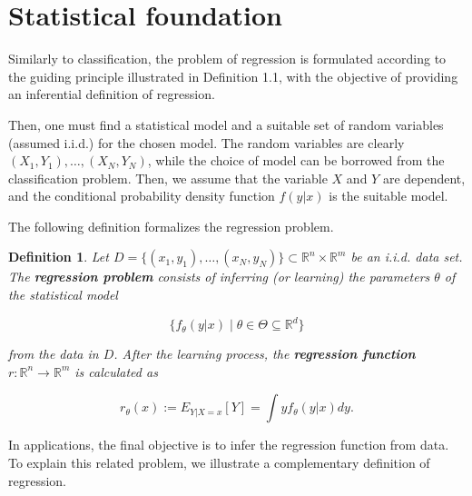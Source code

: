 \documentclass{report}
\newtheorem{definition}{Definition}[chapter]
\begin{document}
\section{Statistical foundation}
Similarly to classification, the problem of regression is formulated according to the guiding principle illustrated in Definition 1.1, with the objective of providing an inferential definition of regression.

Then, one must find a statistical model and a suitable set of random variables (assumed i.i.d.) for the chosen model. The random variables are clearly $(X_1,Y_1),\dots,(X_N,Y_N)$, while the choice of model can be borrowed from the classification problem. Then, we assume that the variable $X$ and $Y$ are dependent, and the conditional probability density function $f(y|x)$ is the suitable model.

The following definition formalizes the regression problem.

\begin{definition}
Let $D = \{(x_1,y_1),\dots,(x_N,y_N)\} \subset \mathbb{R}^n \times \mathbb{R}^m$ be an i.i.d. data set. The \textbf{regression problem} consists of inferring (or learning) the parameters $\theta$ of the statistical model

\begin{equation}
\{f_\theta(y|x) \mid \theta \in \Theta \subseteq \mathbb{R}^d\}
\end{equation}

from the data in $D$. After the learning process, the \textbf{regression function} $r : \mathbb{R}^n \to \mathbb{R}^m$ is calculated as

\begin{equation}
r_\theta(x) := E_{Y|X = x}[Y] = \int yf_\theta(y|x)dy.
\end{equation}
\end{definition}

In applications, the final objective is to infer the regression function from data. To explain this related problem, we illustrate a complementary definition of regression.
\end{document}
